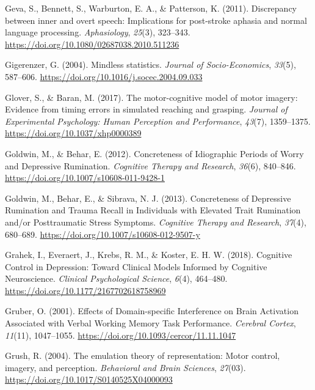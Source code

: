 \documentclass[a4paper,12pt,twoside,openright,oldfontcommands]{memoir}
\begin{document}
\leavevmode\hypertarget{ref-geva_discrepancy_2011}{}%
Geva, S., Bennett, S., Warburton, E. A., \& Patterson, K. (2011). Discrepancy between inner and overt speech: Implications for post-stroke aphasia and normal language processing. \emph{Aphasiology}, \emph{25}(3), 323--343. \url{https://doi.org/10.1080/02687038.2010.511236}

\leavevmode\hypertarget{ref-Gigerenzer2004}{}%
Gigerenzer, G. (2004). Mindless statistics. \emph{Journal of Socio-Economics}, \emph{33}(5), 587--606. \url{https://doi.org/10.1016/j.socec.2004.09.033}

\leavevmode\hypertarget{ref-glover_motor-cognitive_2017}{}%
Glover, S., \& Baran, M. (2017). The motor-cognitive model of motor imagery: Evidence from timing errors in simulated reaching and grasping. \emph{Journal of Experimental Psychology: Human Perception and Performance}, \emph{43}(7), 1359--1375. \url{https://doi.org/10.1037/xhp0000389}

\leavevmode\hypertarget{ref-goldwin_concreteness_2012}{}%
Goldwin, M., \& Behar, E. (2012). Concreteness of Idiographic Periods of Worry and Depressive Rumination. \emph{Cognitive Therapy and Research}, \emph{36}(6), 840--846. \url{https://doi.org/10.1007/s10608-011-9428-1}

\leavevmode\hypertarget{ref-goldwin_concreteness_2013}{}%
Goldwin, M., Behar, E., \& Sibrava, N. J. (2013). Concreteness of Depressive Rumination and Trauma Recall in Individuals with Elevated Trait Rumination and/or Posttraumatic Stress Symptoms. \emph{Cognitive Therapy and Research}, \emph{37}(4), 680--689. \url{https://doi.org/10.1007/s10608-012-9507-y}

\leavevmode\hypertarget{ref-grahek_cognitive_2018}{}%
Grahek, I., Everaert, J., Krebs, R. M., \& Koster, E. H. W. (2018). Cognitive Control in Depression: Toward Clinical Models Informed by Cognitive Neuroscience. \emph{Clinical Psychological Science}, \emph{6}(4), 464--480. \url{https://doi.org/10.1177/2167702618758969}

\leavevmode\hypertarget{ref-gruber_effects_2001}{}%
Gruber, O. (2001). Effects of Domain-specific Interference on Brain Activation Associated with Verbal Working Memory Task Performance. \emph{Cerebral Cortex}, \emph{11}(11), 1047--1055. \url{https://doi.org/10.1093/cercor/11.11.1047}

\leavevmode\hypertarget{ref-grush_emulation_2004}{}%
Grush, R. (2004). The emulation theory of representation: Motor control, imagery, and perception. \emph{Behavioral and Brain Sciences}, \emph{27}(03). \url{https://doi.org/10.1017/S0140525X04000093}
\end{document}
